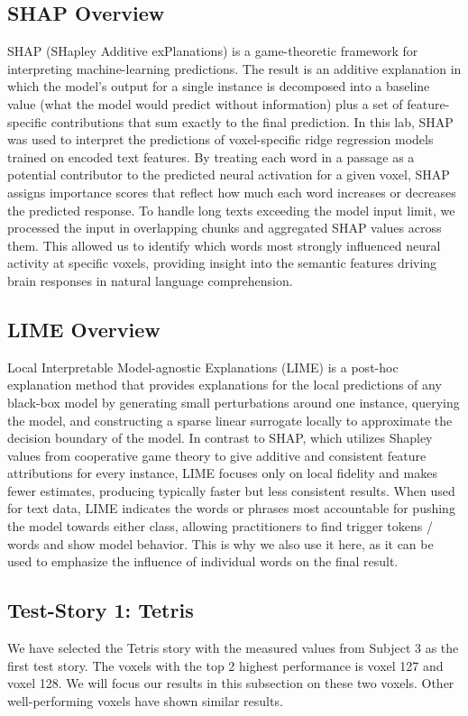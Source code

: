\documentclass[12pt,letterpaper]{article}
\begin{document}
\subsection{SHAP Overview}
SHAP (SHapley Additive exPlanations) is a game-theoretic framework for interpreting machine-learning predictions. The result is an additive explanation in which the model’s output for a single instance is decomposed into a baseline value (what the model would predict without information) plus a set of feature-specific contributions that sum exactly to the final prediction. In this lab, SHAP was used to interpret the predictions of voxel-specific ridge regression models trained on encoded text features. By treating each word in a passage as a potential contributor to the predicted neural activation for a given voxel, SHAP assigns importance scores that reflect how much each word increases or decreases the predicted response. To handle long texts exceeding the model input limit, we processed the input in overlapping chunks and aggregated SHAP values across them. This allowed us to identify which words most strongly influenced neural activity at specific voxels, providing insight into the semantic features driving brain responses in natural language comprehension.

\subsection{LIME Overview}
Local Interpretable Model-agnostic Explanations (LIME) is a post-hoc explanation method that provides explanations for the local predictions of any black-box model by generating small perturbations around one instance, querying the model, and constructing a sparse linear surrogate locally to approximate the decision boundary of the model. In contrast to SHAP, which utilizes Shapley values from cooperative game theory to give additive and consistent feature attributions for every instance, LIME focuses only on local fidelity and makes fewer estimates, producing typically faster but less consistent results. When used for text data, LIME indicates the words or phrases most accountable for pushing the model towards either class, allowing practitioners to find trigger tokens / words and show model behavior. This is why we also use it here, as it can be used to emphasize the influence of individual words on the final result.

\subsection{Test-Story 1: Tetris}
We have selected the Tetris story with the measured values from Subject 3 as the first test story. The voxels with the top 2 highest performance is voxel 127 and voxel 128. We will focus our results in this subsection on these two voxels. Other well-performing voxels have shown similar results.
\end{document}
